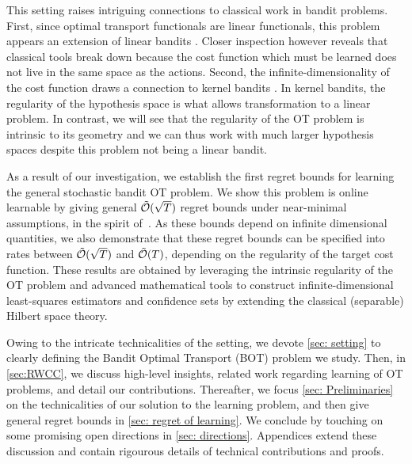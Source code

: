 This setting raises intriguing connections to classical work in bandit problems.
First, since optimal transport functionals are linear functionals, this problem appears an extension of linear bandits \citep{auer_using_2003}. Closer inspection however reveals that classical tools break down because the cost function which must be learned does not live in the same space as the actions. Second, the infinite-dimensionality of the cost function  draws a connection to kernel bandits \citep{valko_finite-time_2013}. In kernel bandits, the regularity of the hypothesis space is what allows transformation to a linear problem. In contrast, we will see that the regularity of the OT problem is intrinsic to its geometry  and we can thus work with much larger hypothesis spaces despite this problem not being a linear bandit.

As a result of our investigation, we establish the first regret bounds for learning the general stochastic bandit OT problem. We show this problem is online learnable by giving general $\tilde{\mathcal{O}}(\sqrt{T})$ regret bounds under near-minimal assumptions, in the spirit of~\cite{abbasi-yadkori_online_2012}. As these bounds depend on infinite dimensional quantities, we also demonstrate that these regret bounds can be specified into rates between $\tilde{\mathcal{O}}(\sqrt{T})$ and $\tilde{\mathcal{O}}(T)$, depending on the regularity of the target cost function. 
These results are obtained by leveraging the intrinsic regularity of the OT problem and advanced mathematical tools to construct infinite-dimensional least-squares estimators and confidence sets by extending the classical (separable) Hilbert space theory. 

 Owing to the intricate technicalities of the setting, we devote \cref{sec: setting} to clearly defining the Bandit Optimal Transport (BOT) problem we study. Then, in \cref{sec:RWCC}, we discuss high-level insights, related work regarding learning of OT problems, and detail our contributions. Thereafter, we focus \cref{sec: Preliminaries} on the technicalities of our solution to the learning problem, and then give general regret bounds in \cref{sec: regret of learning}. We conclude by touching on some promising open directions in \cref{sec: directions}. Appendices extend these discussion and contain rigourous details of technical contributions and proofs.





